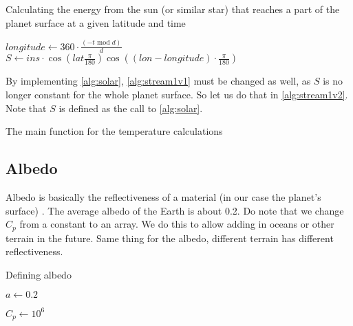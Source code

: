\begin{algorithm}[hbt]
    \caption{Calculating the energy from the sun (or similar star) that reaches a part of the planet surface at a given latitude and time}
    \label{alg:solar}
    \SetAlgoLined
    $longitude \leftarrow 360 \cdot \frac{(-t \text{ mod } d)}{d}$ \;
    $S \leftarrow ins \cdot \cos(lat \frac{\pi}{180}) \cos((lon - longitude) \cdot \frac{\pi}{180})$ \;
\end{algorithm}

By implementing \autoref{alg:solar}, \autoref{alg:stream1v1} must be changed as well, as $S$ is no longer constant for the whole planet surface. So let us do that in \autoref{alg:stream1v2}. Note 
that $S$ is defined as the call to \autoref{alg:solar}. 
\begin{algorithm}[hbt]
    \caption{The main function for the temperature calculations}
    \label{alg:stream1v2}
    \SetAlgoLined

\end{algorithm}

\subsection{Albedo}
Albedo is basically the reflectiveness of a material (in our case the planet's surface) \cite{albedo}. The average albedo of the Earth is about 0.2. Do note that we change $C_p$ from a constant 
to an array. We do this to allow adding in oceans or other terrain in the future. Same thing for the albedo, different terrain has different reflectiveness.

\begin{algorithm}[hbt]
    \caption{Defining albedo}
    \label{alg:albedo}
    $a \leftarrow 0.2$ \;

    $C_p \leftarrow 10^6$ \;
\end{algorithm}

